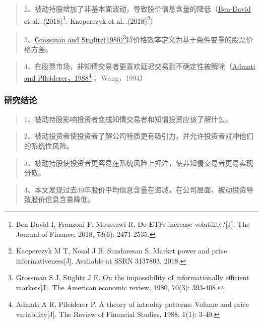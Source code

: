 \documentclass[
]{article}
\begin{document}
\begin{quote}
2、被动持股增加了非基本面波动，导致股价信息含量的降低（\href{https://doi.org/10.1111/jofi.12727}{Ben-David
et al.~(2018)}\footnote{Ben‐David I, Franzoni F, Moussawi R. Do ETFs
  increase volatility?{[}J{]}. The Journal of Finance, 2018, 73(6):
  2471-2535.}; \href{https://dx.doi.org/10.2139/ssrn.3137803}{Kacperczyk
et al.~(2018)}\footnote{Kacperczyk M T, Nosal J B, Sundaresan S. Market
  power and price informativeness{[}J{]}. Available at SSRN 3137803,
  2018.}）
\end{quote}

\begin{quote}
3、\href{https://www.jstor.org/stable/1805228}{Grossman and
Stiglitz(1980)}\footnote{Grossman S J, Stiglitz J E. On the
  impossibility of informationally efficient markets{[}J{]}. The
  American economic review, 1980, 70(3): 393-408.}将价格效率定义为基于条件变量的股票价格方差。
\end{quote}

\begin{quote}
4、在股票市场，非知情交易者更喜欢延迟交易到不确定性被解除（\href{https://doi.org/10.1093/rfs/1.1.3}{Admati
and Pfleiderer，1988}\footnote{Admati A R, Pfleiderer P. A theory of
  intraday patterns: Volume and price variability{[}J{]}. The Review of
  Financial Studies, 1988, 1(1): 3-40.}； Wang，1994）
\end{quote}

\hypertarget{ux7814ux7a76ux7ed3ux8bba-3}{%
\subsubsection{研究结论}\label{ux7814ux7a76ux7ed3ux8bba-3}}

\begin{quote}
1、被动持股影响投资者变成知情交易者和知情投资应该了解什么。
\end{quote}

\begin{quote}
2、被动投资者使投资者了解公司特质更有吸引力，并允许投资者对冲他们的系统性风险。
\end{quote}

\begin{quote}
3、被动持股使投资者更容易在系统风险上押注，使非知情交易者更易实现分散。
\end{quote}

\begin{quote}
4、本文发现过去30年股价平均信息含量在递减，在公司层面，被动投资导致股价信息含量降低。
\end{quote}
\end{document}
